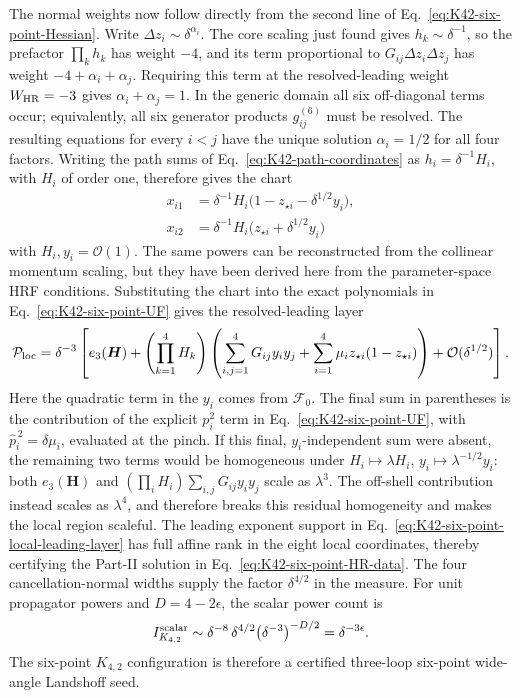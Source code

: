 \documentclass[a4paper,11pt]{article}
\newcommand{\WHR}{W_{\rm HR}}
\begin{document}
The normal weights now follow directly from the second line of
Eq.~\eqref{eq:K42-six-point-Hessian}.  Write
\(\Delta z_i\sim\delta^{\alpha_i}\).  The core scaling just found gives
\(h_k\sim\delta^{-1}\), so the prefactor \(\prod_k h_k\) has weight \(-4\),
and its term proportional to \(G_{ij}\Delta z_i\Delta z_j\) has weight
\(-4+\alpha_i+\alpha_j\).  Requiring this term at the resolved-leading weight
\(\WHR=-3\) gives \(\alpha_i+\alpha_j=1\).  In the generic domain all six
off-diagonal terms occur; equivalently, all six generator products
\(g_{ij}^{(6)}\) must be resolved.  The resulting equations for every \(i<j\)
have the unique solution \(\alpha_i=1/2\) for all four factors.  Writing the path sums of
Eq.~\eqref{eq:K42-path-coordinates} as \(h_i=\delta^{-1}H_i\), with \(H_i\)
of order one, therefore gives the chart
\begin{align}
 x_{i1}&=\delta^{-1}H_i
   \bigl(1-z_{\star i}-\delta^{1/2}y_i\bigr),\nonumber\\
 x_{i2}&=\delta^{-1}H_i
   \bigl(z_{\star i}+\delta^{1/2}y_i\bigr)
 \label{eq:K42-six-point-local-chart}
\end{align}
with \(H_i,y_i=\mathcal O(1)\).  The same powers can be reconstructed from the
collinear momentum scaling, but they have been derived here from the
parameter-space HRF conditions.  Substituting the chart into the exact
polynomials in Eq.~\eqref{eq:K42-six-point-UF} gives the resolved-leading layer
\begin{equation}
 \mathcal P_{\rm loc}
 =\delta^{-3}\left[
 e_3(\boldsymbol H)
 +\left(\prod_{k=1}^4H_k\right)
  \left(
   \sum_{i,j=1}^4G_{ij}y_i y_j
   +\sum_{i=1}^4\mu_i z_{\star i}(1-z_{\star i})
  \right)
 +\mathcal O(\delta^{1/2})\right].
 \label{eq:K42-six-point-local-leading-layer}
\end{equation}
Here the quadratic term in the \(y_i\) comes from \(\mathcal F_0\).  The final
sum in parentheses is the contribution of the explicit \(p_i^2\) term in
Eq.~\eqref{eq:K42-six-point-UF}, with
\(\widehat p_i^{\,2}=\delta\mu_i\), evaluated at the pinch.  If this final,
\(y_i\)-independent sum were absent, the remaining two terms would be
homogeneous under
\(H_i\mapsto\lambda H_i\), \(y_i\mapsto\lambda^{-1/2}y_i\): both
\(e_3(\boldsymbol H)\) and
\((\prod_iH_i)\sum_{i,j}G_{ij}y_i y_j\) scale as \(\lambda^3\).  The
off-shell contribution instead scales as \(\lambda^4\), and therefore breaks
this residual homogeneity and makes the local region scaleful.  The leading
exponent support in
Eq.~\eqref{eq:K42-six-point-local-leading-layer} has full affine rank in the
eight local coordinates, thereby certifying the Part-II solution in
Eq.~\eqref{eq:K42-six-point-HR-data}.
The four cancellation-normal widths supply the factor \(\delta^{4/2}\) in the
measure.  For unit propagator powers and \(D=4-2\epsilon\), the scalar power
count is
\begin{equation}
 I_{K_{4,2}}^{\rm scalar}\sim
 \delta^{-8}\,\delta^{4/2}
 \bigl(\delta^{-3}\bigr)^{-D/2}
 =\delta^{-3\epsilon}.
 \label{eq:K42-six-point-power-count}
\end{equation}
The six-point \(K_{4,2}\) configuration is therefore a certified
three-loop six-point wide-angle Landshoff seed.
\end{document}
